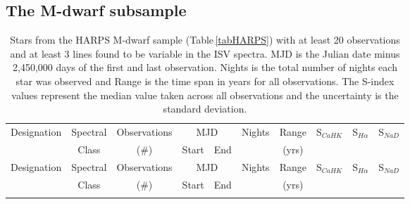\subsection{The M-dwarf subsample}
\begin{landscape}
    \begin{longtable}{|c|c|c|c|c|c|c|c|c|c|}
    \captionsetup{width=1.4\textwidth}
    \hline
    Designation & Spectral & Observations & \multicolumn{2}{c|}{MJD} & Nights & Range & S$_{CaHK}$ & S$_{H\alpha}$ & S$_{NaD}$\\
    \cline{4-5}
     & Class & (\#) & Start & End & & (yrs) &  &  & \\
    \hline
    \endfirsthead
    
    \hline
    Designation & Spectral & Observations & \multicolumn{2}{c|}{MJD} & Nights & Range & S$_{CaHK}$ & S$_{H\alpha}$ & S$_{NaD}$\\
    \cline{4-5}
     & Class & (\#) & Start & End & & (yrs) &  &  & \\
    \hline
    \endhead
    
    \hline
    \caption{Stars from the HARPS M-dwarf sample (Table\,\ref{tabHARPS}) with at least 20 observations and at least 3 lines found to be variable in the ISV spectra. MJD is the Julian date minus 2,450,000 days of the first and last observation. Nights is the total number of nights each star was observed and Range is the time span in years for all observations. The S-index values represent the median value taken across all observations and the uncertainty is the standard deviation.}
    \endfoot
    

\end{longtable}
\end{landscape}
